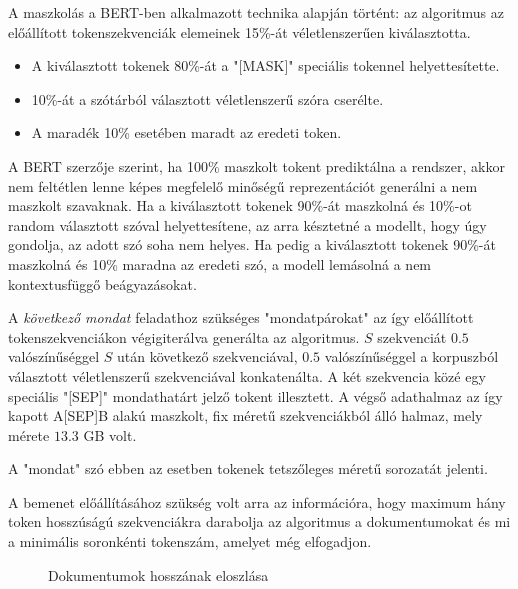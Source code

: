 A maszkolás a BERT-ben alkalmazott technika alapján történt: az algoritmus az előállított tokenszekvenciák elemeinek 15\%-át véletlenszerűen kiválasztotta. 
\begin{itemize}
	\item A kiválasztott tokenek 80\%-át a "[MASK]" speciális tokennel helyettesítette. 
	\item 10\%-át a szótárból választott véletlenszerű szóra cserélte.
	\item A maradék 10\% esetében maradt az eredeti token.
\end{itemize}

A BERT szerzője szerint, ha 100\% maszkolt tokent prediktálna a rendszer, akkor nem feltétlen lenne képes megfelelő minőségű reprezentációt generálni a nem maszkolt szavaknak. Ha a kiválasztott tokenek 90\%-át maszkolná és 10\%-ot random választott szóval helyettesítene, az arra késztetné a modellt, hogy úgy gondolja, az adott szó soha nem helyes. Ha pedig a kiválasztott tokenek 90\%-át maszkolná és 10\% maradna az eredeti szó, a modell lemásolná a nem kontextusfüggő beágyazásokat. \cite{bertappendix}

A \textit{következő mondat} feladathoz szükséges "mondatpárokat" az így előállított tokenszekvenciákon végigiterálva generálta az algoritmus. $S$ szekvenciát $0.5$ valószínűséggel $S$ után következő szekvenciával, $0.5$ valószínűséggel a korpuszból választott véletlenszerű szekvenciával konkatenálta. A két szekvencia közé egy speciális "[SEP]" mondathatárt jelző tokent illesztett. A végső adathalmaz az így kapott A[SEP]B alakú maszkolt, fix méretű szekvenciákból álló halmaz, mely mérete $13.3$ GB volt.

\begin{note}
A "mondat" szó ebben az esetben tokenek tetszőleges méretű sorozatát jelenti.
\end{note}
 
A bemenet előállításához szükség volt arra az információra, hogy maximum hány token hosszúságú szekvenciákra darabolja az algoritmus a dokumentumokat és mi a minimális soronkénti tokenszám, amelyet még elfogadjon.

\begin{figure}[H]
	\centering
	\hspace{5pt}
	\caption{Dokumentumok hosszának eloszlása}
	\label{fig:doc_lengths}
\end{figure}

